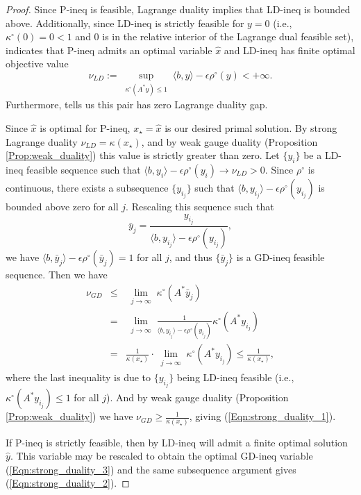 \begin{proof}
Since P-ineq is feasible, Lagrange duality implies that LD-ineq is bounded above.  Additionally, since LD-ineq is strictly feasible for $y=0$ (i.e., $\kappa^\circ(0) = 0< 1$ and $0$ is in the relative interior of the Lagrange dual feasible set), \cite[Theorem 28.2]{rockafellar1970convex} indicates that P-ineq admits an optimal variable $\hat{x}$ and LD-ineq has finite optimal objective value  
\begin{equation*}
\nu_{LD} := \sup\limits_{\substack{\kappa^\circ(A^*y) \leq 1}} \langle b, y \rangle - \epsilon \rho^\circ(y)  < +\infty.
\end{equation*}
Furthermore, \cite[Theorem 28.4]{rockafellar1970convex} tells us this pair has zero Lagrange duality gap.

Since $\hat{x}$ is optimal for P-ineq, $x_\star = \hat{x}$ is our desired primal solution.  By strong Lagrange duality $\nu_{LD} = \kappa(x_\star)$,  and by weak gauge duality (Proposition \ref{Prop:weak_duality}) this value is strictly greater than zero.  Let $\{ y_i \}$ be a LD-ineq feasible sequence such that $\langle b, y_i \rangle - \epsilon \rho^\circ(y_i) \rightarrow \nu_{LD} > 0$.  Since $\rho^\circ$ is continuous, there exists a subsequence $\{ y_{i_j} \}$ such that $\langle b, y_{i_j} \rangle - \epsilon \rho^\circ(y_{i_j}) $ is bounded above zero for all $j$.  Rescaling this sequence such that
\begin{equation*}
\bar{y}_j = \frac{y_{i_j}}{\langle b, y_{i_j} \rangle - \epsilon \rho^\circ(y_{i_j})},
\end{equation*}
we have $\langle b, \bar{y}_j \rangle - \epsilon \rho^\circ(\bar{y}_j) = 1$ for all $j$, and thus $\{ \bar{y}_j \}$ is a GD-ineq feasible sequence.  Then we have
\begin{equation*}
\begin{array}{rcl}
\nu_{GD} &	\leq & \lim\limits_{\substack{j \rightarrow \infty}} \kappa^\circ(A^* \bar{y}_j)	\\
	&	=	&	\lim\limits_{\substack{j \rightarrow \infty}}  \frac{1}{ \langle b, y_{i_j} \rangle - \epsilon \rho^\circ(y_{i_j})} \kappa^\circ(A^*y_{i_j}) \\
	&	=	&	\frac{1}{\kappa(x_\star)} \cdot \lim\limits_{\substack{j \rightarrow \infty}}  \kappa^\circ(A^*y_{i_j}) \leq \frac{1}{\kappa(x_\star)},
\end{array}
\end{equation*}
where the last inequality is due to $\{ y_{i_j} \}$ being LD-ineq feasible (i.e., $\kappa^\circ(A^*y_{i_j}) \leq 1$ for all $j$).  And by weak gauge duality (Proposition \ref{Prop:weak_duality}) we have $\nu_{GD} \geq \frac{1}{\kappa(x_\star)}$, giving (\ref{Eqn:strong_duality_1}).

If P-ineq is strictly feasible, then by \cite[Theorem 28.2]{rockafellar1970convex} LD-ineq will admit a finite optimal solution $\hat{y}$. This variable may be rescaled to obtain the optimal GD-ineq variable (\ref{Eqn:strong_duality_3}) and the same subsequence argument gives (\ref{Eqn:strong_duality_2}).

\end{proof}

